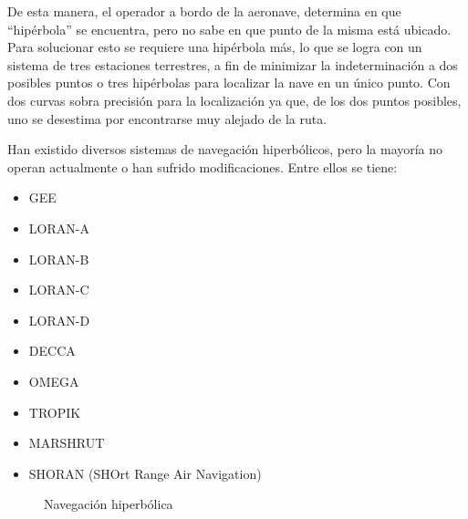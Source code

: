 De esta manera, el operador a bordo de la aeronave, determina en que ``hip\'erbola'' se encuentra, pero no sabe en que punto de la misma est\'a ubicado. 
Para solucionar esto se requiere una hip\'erbola m\'as, lo que se logra
con un sistema de tres estaciones terrestres, 
a fin de minimizar la indeterminaci\'on a dos posibles puntos 
o tres hip\'erbolas para localizar la nave en un \'unico punto. 
Con dos curvas sobra precisi\'on para la localizaci\'on ya que, 
de los dos puntos posibles, uno se desestima por encontrarse muy alejado de la ruta.

Han existido diversos sistemas de navegaci\'on hiperb\'olicos, pero la mayor\'ia no operan actualmente o han sufrido modificaciones. Entre ellos se tiene:
\begin{multicols}{2}
\begin{itemize}
\item GEE

\item LORAN-A
\item  LORAN-B
\item LORAN-C
\item LORAN-D

\item DECCA

\item OMEGA

\item TROPIK

\item MARSHRUT

\item SHORAN (SHOrt Range Air Navigation)
\end{itemize}
\end{multicols}

\begin{figure}[!h]
  \centering
\hspace{1em}
 \caption{Navegaci\'on hiperb\'olica}

\end{figure}


